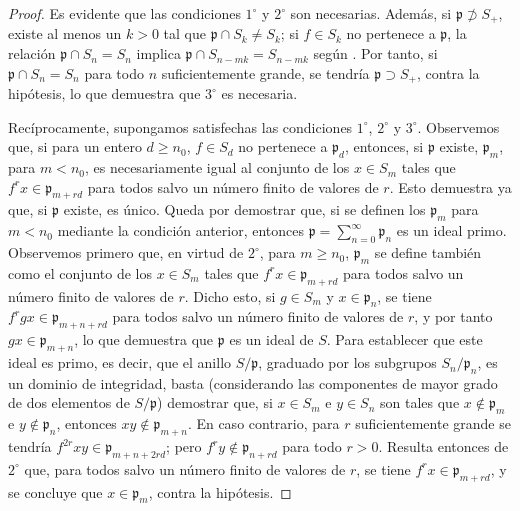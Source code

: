 \documentclass[oneside,10pt]{amsart}
\renewcommand{\geq}{\geqslant}
\newcommand{\oldpage}[2][]{\marginnote{\normalfont\footnotesize\textbf{#1}~|~#2}\ignorespaces}
\begin{document}
\begin{proof}
Es evidente que las condiciones $1^\circ$ y $2^\circ$ son necesarias.
Además, si $\mathfrak{p}\not\supset S_+$, existe al menos un $k>0$ tal que $\mathfrak{p}\cap S_k\neq S_k$; si $f\in S_k$ no pertenece a $\mathfrak{p}$, la relación $\mathfrak{p}\cap S_n=S_n$ implica $\mathfrak{p}\cap S_{n-mk}=S_{n-mk}$ según .
Por tanto, si $\mathfrak{p}\cap S_n=S_n$ para todo $n$ suficientemente grande, se tendría $\mathfrak{p}\supset S_+$, contra la hipótesis, lo que demuestra que $3^\circ$ es necesaria.

Recíprocamente, supongamos satisfechas las condiciones $1^\circ$, $2^\circ$ y $3^\circ$.
Observemos que, si para un entero $d\geq n_0$, $f\in S_d$ no pertenece a $\mathfrak{p}_d$, entonces, si $\mathfrak{p}$ existe, $\mathfrak{p}_m$, para $m<n_0$, es necesariamente igual al conjunto de los $x\in S_m$ tales que $f^rx\in\mathfrak{p}_{m+rd}$ para todos salvo un número finito de valores de $r$.
Esto demuestra ya que, si $\mathfrak{p}$ existe, es único.
Queda por demostrar que, si se definen los $\mathfrak{p}_m$ para $m<n_0$ mediante la condición anterior, entonces $\mathfrak{p}=\sum_{n=0}^{\infty}\mathfrak{p}_n$ es un ideal primo.
Observemos primero que, en virtud de $2^\circ$, para $m\geq n_0$, $\mathfrak{p}_m$ se define también como el conjunto de los $x\in S_m$ tales que $f^rx\in\mathfrak{p}_{m+rd}$ para todos salvo un número finito de valores de $r$.
Dicho
\oldpage[II]{23}
esto, si $g\in S_m$ y $x\in\mathfrak{p}_n$, se tiene $f^rgx\in\mathfrak{p}_{m+n+rd}$ para todos salvo un número finito de valores de $r$, y por tanto $gx\in\mathfrak{p}_{m+n}$, lo que demuestra que $\mathfrak{p}$ es un ideal de $S$.
Para establecer que este ideal es primo, es decir, que el anillo $S/\mathfrak{p}$, graduado por los subgrupos $S_n/\mathfrak{p}_n$, es un dominio de integridad, basta (considerando las componentes de mayor grado de dos elementos de $S/\mathfrak{p}$) demostrar que, si $x\in S_m$ e $y\in S_n$ son tales que $x\notin\mathfrak{p}_m$ e $y\notin\mathfrak{p}_n$, entonces $xy\notin\mathfrak{p}_{m+n}$.
En caso contrario, para $r$ suficientemente grande se tendría $f^{2r}xy\in\mathfrak{p}_{m+n+2rd}$; pero $f^ry\notin\mathfrak{p}_{n+rd}$ para todo $r>0$.
Resulta entonces de $2^\circ$ que, para todos salvo un número finito de valores de $r$, se tiene $f^rx\in\mathfrak{p}_{m+rd}$, y se concluye que $x\in\mathfrak{p}_m$, contra la hipótesis.
\end{proof}
\end{document}
